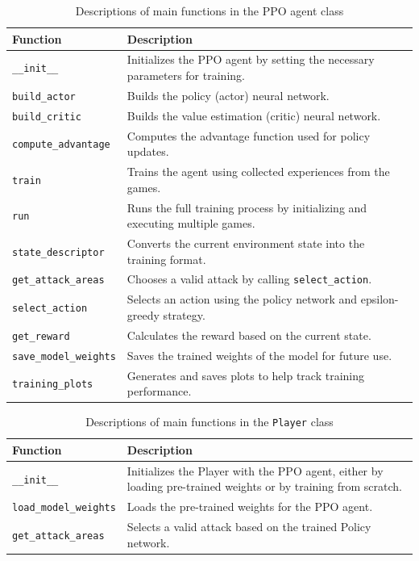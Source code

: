 \documentclass{article}
\begin{document}
\begin{table}[h]
\centering
\begin{tabularx}{\textwidth}{l X}
\textbf{Function} & \textbf{Description} \\
\hline
\texttt{\_\_init\_\_} & Initializes the PPO agent by setting the necessary parameters for training. \\
\texttt{build\_actor} & Builds the policy (actor) neural network. \\
\texttt{build\_critic} & Builds the value estimation (critic) neural network. \\
\texttt{compute\_advantage} & Computes the advantage function used for policy updates. \\
\texttt{train} & Trains the agent using collected experiences from the games. \\
\texttt{run} & Runs the full training process by initializing and executing multiple games. \\
\texttt{state\_descriptor} & Converts the current environment state into the training format. \\
\texttt{get\_attack\_areas} & Chooses a valid attack by calling \texttt{select\_action}. \\
\texttt{select\_action} & Selects an action using the policy network and epsilon-greedy strategy. \\
\texttt{get\_reward} & Calculates the reward based on the current state. \\
\texttt{save\_model\_weights} & Saves the trained weights of the model for future use. \\
\texttt{training\_plots} & Generates and saves plots to help track training performance. \\
\end{tabularx}
\caption{Descriptions of main functions in the PPO agent class}
\label{tab:ppo-functions}
\end{table}

\begin{table}[h]
\centering
\begin{tabularx}{\textwidth}{l X}
\textbf{Function} & \textbf{Description} \\
\hline
\texttt{\_\_init\_\_} & Initializes the Player with the PPO agent, either by loading pre-trained weights or by training from scratch. \\
\texttt{load\_model\_weights} & Loads the pre-trained weights for the PPO agent. \\
\texttt{get\_attack\_areas} & Selects a valid attack based on the trained Policy network. \\
\end{tabularx}
\caption{Descriptions of main functions in the \texttt{Player} class}
\label{tab:player-functions}
\end{table}
\end{document}
